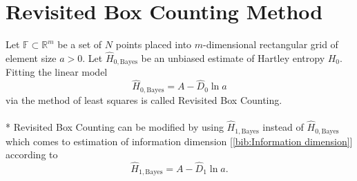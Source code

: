 \section {Revisited Box Counting Method}
Let $\mathbb{F} \subset \mathbb{R}^{m}$ be a set of $N$ points placed into $m$-dimensional rectangular grid of element size $a > 0$. Let $\hat{H}_{0,\mathrm{Bayes}}$ be an unbiased estimate of Hartley entropy $H_{0}$. Fitting the linear model
\begin{equation} 
\label{eq:hlinmod}
\hat{H}_{0,\mathrm{Bayes}} = A - \hat{D}_{0}\ln{a}
\end{equation}
via the method of least squares is called Revisited Box Counting.\\
\\*
Revisited Box Counting can be modified by %
using $\hat{H}_{1,\mathrm{Bayes}}$ instead of $\hat{H}_{0,\mathrm{Bayes}}$ which comes to estimation of information dimension [\ref{bib:Information dimension}] according to
\begin{equation} 
\label{eq:inform}
\hat{H}_{1,\mathrm{Bayes}} = A - \hat{D}_{1}\ln{a}.
\end{equation}
